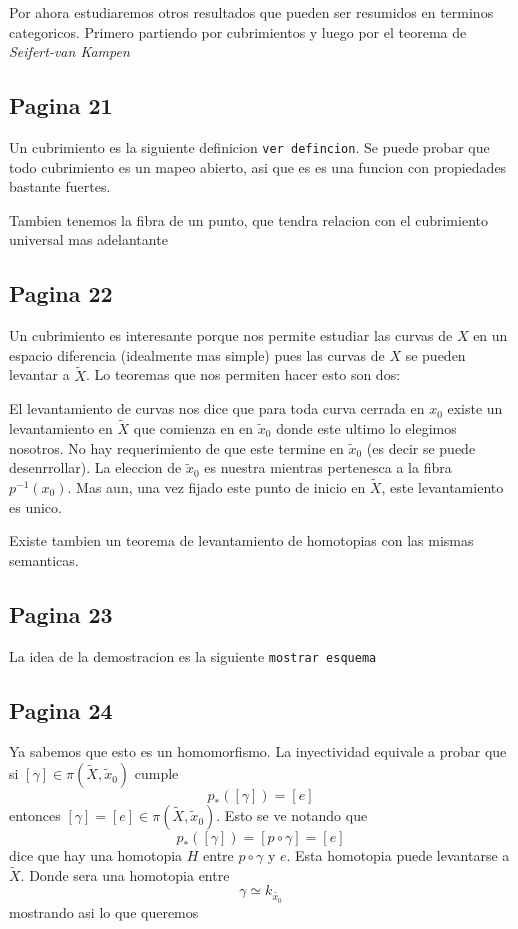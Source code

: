 \documentclass[letterpaper]{article}
\newcommand{\vank}{\emph{Seifert-van Kampen} }
\begin{document}
Por ahora estudiaremos otros resultados que pueden ser resumidos en
terminos categoricos. Primero partiendo por cubrimientos y luego por el
teorema de \vank

\subsection*{Pagina 21}
Un cubrimiento es la siguiente definicion \texttt{ver defincion}. Se
puede probar que todo cubrimiento es un mapeo abierto, asi que es es una
funcion con propiedades bastante fuertes.

Tambien tenemos la fibra de un punto, que tendra relacion con el
cubrimiento universal mas adelantante

\subsection*{Pagina 22}
Un cubrimiento es interesante porque nos permite estudiar las curvas de
\(X\) en un espacio diferencia (idealmente mas simple) pues las curvas
de \(X\) se pueden levantar a \(\tilde X\). Lo teoremas que nos permiten
hacer esto son dos:

El levantamiento de curvas nos dice que para toda curva cerrada en
\(x_0\) existe un levantamiento en \(\tilde X\) que comienza en en
\(\tilde x_0\) donde este ultimo lo elegimos nosotros. No hay
requerimiento de que este termine en \(\tilde x_0\) (es decir se puede
desenrrollar). La eleccion de \(\tilde x_0\) es nuestra mientras
pertenesca a la fibra \(p^{-1} (x_0)\). Mas aun, una vez fijado este
punto de inicio en \(\tilde X\), este levantamiento es unico.

Existe tambien un teorema de levantamiento de homotopias con las mismas
semanticas.

\subsection*{Pagina 23}
La idea de la demostracion es la siguiente \texttt{mostrar esquema}

\subsection*{Pagina 24}
Ya sabemos que esto es un homomorfismo. La inyectividad equivale a
probar que si \([\gamma] \in \pi (\tilde X, \tilde x_0)\) cumple
\[ p_* ([\gamma]) = [e]\]
entonces \([\gamma] = [e] \in \pi (\tilde X, \tilde x_0)\). Esto se ve
notando que
\[ p_* ([\gamma]) = [p \circ \gamma] = [e]\]
dice que hay una homotopia \(H\) entre \(p \circ \gamma\) y \(e\). Esta
homotopia puede levantarse a \(\tilde X\). Donde sera una homotopia
entre
\[ \gamma \simeq k_{\tilde {x_0}} \]
mostrando asi lo que queremos
\end{document}
